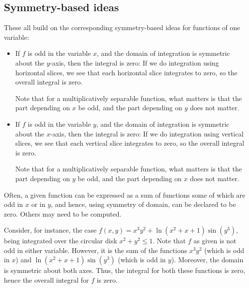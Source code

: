 \documentclass[10pt]{amsart}
\begin{document}
\subsection{Symmetry-based ideas}

These all build on the corresponding symmetry-based ideas for
functions of one variable:

\begin{itemize}
\item If $f$ is odd in the variable $x$, and the domain of integration
  is symmetric about the $y$-axis, then the integral is zero: If we do
  integration using horizontal slices, we see that each horizontal
  slice integrates to zero, so the overall integral is zero.

  Note that for a multiplicatively separable function, what matters is
  that the part depending on $x$ be odd, and the part depending on $y$
  does not matter.
\item If $f$ is odd in the variable $y$, and the domain of integration
  is symmetric about the $x$-axis, then the integral is zero: If we do
  integration using vertical slices, we see that each vertical slice
  integrates to zero, so the overall integral is zero.

  Note that for a multiplicatively separable function, what matters is
  that the part depending on $y$ be odd, and the part depending on $x$
  does not matter.
\end{itemize}

Often, a given function can be expressed as a sum of functions some of
which are odd in $x$ or in $y$, and hence, using symmetry of domain,
can be declared to be zero. Others may need to be computed.

Consider, for instance, the case $f(x,y) = x^3y^2 + \ln(x^2 + x +
1)\sin(y^3)$, being integrated over the circular disk $x^2 + y^2 \le
1$. Note that $f$ as given is not odd in either variable. However, it
is the sum of the functions $x^3y^2$ (which is odd in $x$) and
$\ln(x^2 + x + 1)\sin(y^3)$ (which is odd in $y$). Moreover, the
domain is symmetric about both axes. Thus, the integral for both these
functions is zero, hence the overall integral for $f$ is zero.
\end{document}
